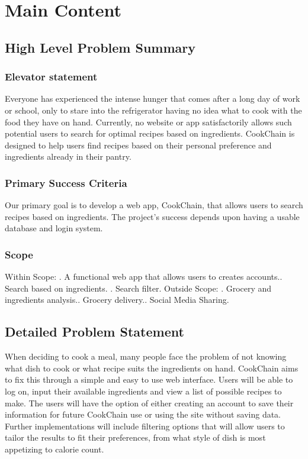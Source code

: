 \documentclass{article}
\begin{document}
\section{Main Content}
\subsection{High Level Problem Summary}
\subsubsection{Elevator statement}
Everyone has experienced the intense hunger that comes after a long day of work or school, only to stare into the refrigerator having no idea what to cook with the food they have on hand. Currently, no website or app satisfactorily allows such potential users to search for optimal recipes based on ingredients. CookChain is designed to help users find recipes based on their personal preference and ingredients already in their pantry.
\subsubsection{Primary Success Criteria}
Our primary goal is to develop a web app, CookChain, that allows users to search recipes based on ingredients. The project's success depends upon having a usable database and login system.
\subsubsection{Scope}
Within Scope: . A functional web app that allows users to creates accounts.. Search based on ingredients. . Search filter.\newline
Outside Scope: . Grocery and ingredients analysis.. Grocery delivery.. Social Media Sharing.\newline
\subsection{Detailed Problem Statement}
When deciding to cook a meal, many people face the problem of not knowing what dish to cook or what recipe suits the ingredients on hand. CookChain aims to fix this through a simple and easy to use web interface. Users will be able to log on, input their available ingredients  and view a list of possible recipes to make. The users will have the option of either creating an account to save their information for future CookChain use or using the site without saving data. Further implementations will include filtering options that will allow users to tailor the results to fit their preferences, from what style of dish is most appetizing to calorie count.
\clearpage
\end{document}
